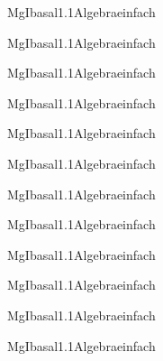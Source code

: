\documentclass[12pt]{article}
\begin{document}
\pagecolor{lightgray!30}

\begin{Add}{MgI}{basal1.1}{Algebra}{einfach}
\solution{ }
\end{Add}
\begin{Add}{MgI}{basal1.1}{Algebra}{einfach}
\end{Add}

\begin{Add}{MgI}{basal1.1}{Algebra}{einfach}
\solution{ }
\end{Add}
\begin{Add}{MgI}{basal1.1}{Algebra}{einfach}
\end{Add}

\begin{Add}{MgI}{basal1.1}{Algebra}{einfach}
\solution{ }
\end{Add}
\begin{Add}{MgI}{basal1.1}{Algebra}{einfach}
\end{Add}

\begin{Add}{MgI}{basal1.1}{Algebra}{einfach}
\solution{ }
\end{Add}
\begin{Add}{MgI}{basal1.1}{Algebra}{einfach}
\end{Add}

\begin{Add}{MgI}{basal1.1}{Algebra}{einfach}
\solution{ }
\end{Add}
\begin{Add}{MgI}{basal1.1}{Algebra}{einfach}
\end{Add}

\begin{Add}{MgI}{basal1.1}{Algebra}{einfach}
\solution{ }
\end{Add}
\begin{Add}{MgI}{basal1.1}{Algebra}{einfach}
\end{Add}
\end{document}
